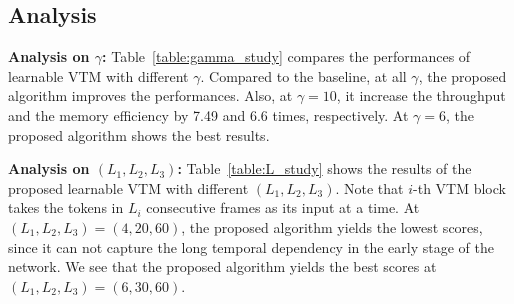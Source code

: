 \documentclass{article}
\begin{document}




\subsection{Analysis}


\noindent\textbf{Analysis on $\gamma$:} Table~\ref{table:gamma_study} compares the performances of learnable VTM with different $\gamma$. Compared to the baseline, at all $\gamma$, the proposed algorithm improves the performances. Also, at $\gamma=10$, it increase the throughput and the memory efficiency by 7.49 and 6.6 times, respectively. At $\gamma=6$, the proposed algorithm shows the best results. 

\vspace{0.2cm}
\noindent\textbf{Analysis on $(L_1, L_2, L_3)$:} Table~\ref{table:L_study} shows the results of the proposed learnable VTM with different $(L_1, L_2, L_3)$. Note that $i$-th VTM block takes the tokens in $L_i$ consecutive frames as its input at a time. At $(L_1, L_2, L_3) = (4, 20, 60)$, the proposed algorithm yields the lowest scores, since it can not capture the long temporal dependency in the early stage of the network. We see that the proposed algorithm yields the best scores at $(L_1, L_2, L_3) = (6, 30, 60)$. 
\end{document}
